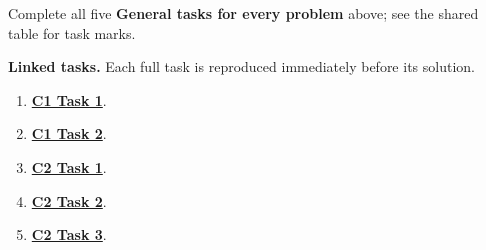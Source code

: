 \par\noindent\begin{minipage}{\linewidth}
\begin{minipage}[t]{.49\linewidth}
\end{minipage}\hfill
\begin{minipage}[t]{.49\linewidth}
\end{minipage}
\end{minipage}\par


Complete all five \textbf{General tasks for every problem} above; see the shared table for task marks.

\clearpage
\textbf{Linked tasks.} Each full task is reproduced immediately before its solution.

\begin{enumerate}[label=(\alph*),itemsep=6pt]
\item \hyperref[sol:p1c1a]{\textbf{C1 Task 1}}. \cOneA\ 
\item \hyperref[sol:p1c1b]{\textbf{C1 Task 2}}. \cOneB\ 
\item \hyperref[sol:p1c2a]{\textbf{C2 Task 1}}. \cTwoA\ 
\item \hyperref[sol:p1c2b]{\textbf{C2 Task 2}}. \cTwoB\ 
\item \hyperref[sol:p1c2c]{\textbf{C2 Task 3}}. \cTwoC\ 
\end{enumerate}
\secInicio[][sec:p1]

